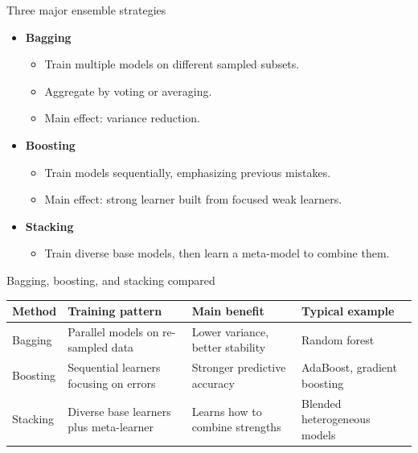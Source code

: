 \documentclass[12pt]{beamer}
\begin{document}
\begin{frame}{Three major ensemble strategies}
  \begin{itemize}
    \item \textbf{Bagging}
      \begin{itemize}
        \item Train multiple models on different sampled subsets.
        \item Aggregate by voting or averaging.
        \item Main effect: variance reduction.
      \end{itemize}
    \item \textbf{Boosting}
      \begin{itemize}
        \item Train models sequentially, emphasizing previous mistakes.
        \item Main effect: strong learner built from focused weak learners.
      \end{itemize}
    \item \textbf{Stacking}
      \begin{itemize}
        \item Train diverse base models, then learn a meta-model to combine them.
      \end{itemize}
  \end{itemize}
\end{frame}

\begin{frame}{Bagging, boosting, and stacking compared}
  \scriptsize
  \renewcommand{\arraystretch}{1.2}
  \setlength{\tabcolsep}{4pt}
  \begin{tabular}{|p{1.8cm}|p{2.5cm}|p{2.7cm}|p{2.2cm}|}
    \hline
    Method & Training pattern & Main benefit & Typical example \\
    \hline
    Bagging & Parallel models on re-sampled data & Lower variance, better stability & Random forest \\
    \hline
    Boosting & Sequential learners focusing on errors & Stronger predictive accuracy & AdaBoost, gradient boosting \\
    \hline
    Stacking & Diverse base learners plus meta-learner & Learns how to combine strengths & Blended heterogeneous models \\
    \hline
  \end{tabular}
  \vspace{0.4em}
\end{frame}
\end{document}
